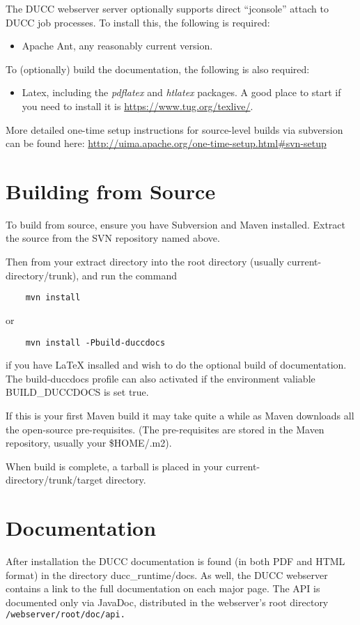 The DUCC webserver server optionally supports direct ``jconsole'' attach to DUCC job processes.  To install
this, the following is required:
\begin{itemize}
    \item Apache Ant, any reasonably current version.
\end{itemize}
    
To (optionally) build the documentation, the following is also required:
\begin{itemize}
  \item Latex, including the \emph{pdflatex} and \emph{htlatex} packages.  A good place
    to start if you need to install it is \url{https://www.tug.org/texlive/}.
\end{itemize}

More detailed one-time setup instructions for source-level builds via subversion can be found here:
\url{http://uima.apache.org/one-time-setup.html#svn-setup}

\section{Building from Source}

To build from source, ensure you have
Subversion and Maven installed.  Extract the source from the SVN repository named above. 

Then from your extract directory into
the root directory (usually current-directory/trunk), and run the command
\begin{verbatim}
    mvn install
\end{verbatim}
or
\begin{verbatim}
    mvn install -Pbuild-duccdocs
\end{verbatim}
if you have LaTeX insalled and wish to do the optional build of documentation.
The build-duccdocs profile can also activated if the environment valiable BUILD\_DUCCDOCS is set true.

If this is your first Maven build it may take quite a while as Maven downloads all the
open-source pre-requisites.  (The pre-requisites are stored in the Maven repository, usually
your \$HOME/.m2).

When build is complete, a tarball is placed in your current-directory/trunk/target
directory.

\section{Documentation}
\begin{sloppypar}
After installation the DUCC documentation is found (in both PDF and HTML format) in the directory 
ducc\_runtime/docs.  As well, the DUCC webserver contains a link to the full documentation on each major page.
The API is documented only via JavaDoc, distributed in the webserver's root directory 
{\tt \duccruntime/webserver/root/doc/api.}  
\end{sloppypar}

